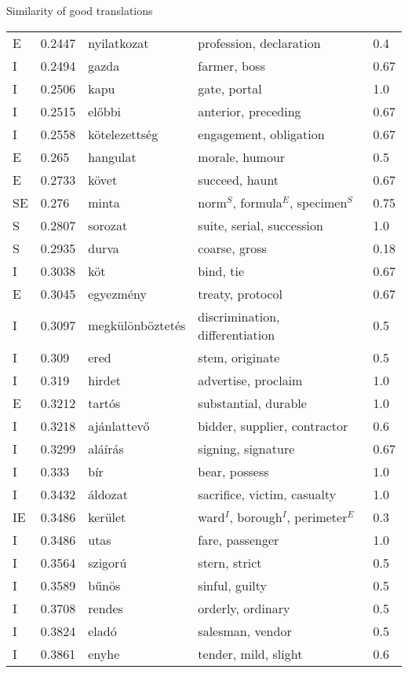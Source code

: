 \documentclass[10pt]{beamer}%
\newcommand{\e}{$^E$}
\newcommand{\id}{$^I$}
\newcommand{\s}{$^S$}
\begin{document}
\begin{frame} [allowframebreaks] {Similarity of good translations}
\begin{longtable}{lllll}
        E	& 0.2447	& nyilatkozat	& profession, declaration	& 0.4 \\
        I	& 0.2494	& gazda	& farmer, boss	& 0.67 \\
        I	& 0.2506	& kapu	& gate, portal	& 1.0 \\
        I	& 0.2515	& előbbi	& anterior, preceding	& 0.67 \\
        I	& 0.2558	& kötelezettség	& engagement, obligation	& 0.67 \\
        E	& 0.265	& hangulat	& morale, humour	& 0.5 \\
        E	& 0.2733	& követ	& succeed, haunt	& 0.67 \\
        SE	& 0.276	& minta	& norm\s, formula\e, specimen\s	& 0.75  \\
        S	& 0.2807	& sorozat	& suite, serial, succession	& 1.0 \\
        S	& 0.2935	& durva	& coarse, gross	& 0.18 \\
        I	& 0.3038	& köt	& bind, tie	& 0.67 \\
        E	& 0.3045	& egyezmény	& treaty, protocol	& 0.67 \\
        I	& 0.3097	& megkülönböztetés	& discrimination, differentiation	& 0.5 \\
        I	& 0.309	& ered	& stem, originate	& 0.5 \\
        I	& 0.319	& hirdet	& advertise, proclaim	& 1.0 \\
        E	& 0.3212	& tartós	& substantial, durable	& 1.0 \\
        I	& 0.3218	& ajánlattevő	& bidder, supplier, contractor	& 0.6 \\
        I	& 0.3299	& aláírás	& signing, signature	& 0.67 \\
        I	& 0.333	& bír	& bear, possess	& 1.0 \\
        I	& 0.3432	& áldozat	& sacrifice, victim, casualty	& 1.0 \\
        IE	& 0.3486	& kerület	& ward\id, borough\id, perimeter\e	& 0.3  \\
        I	& 0.3486	& utas	& fare, passenger	& 1.0 \\
        I	& 0.3564	& szigorú	& stern, strict	& 0.5 \\
        I	& 0.3589	& bűnös	& sinful, guilty	& 0.5 \\
        I	& 0.3708	& rendes	& orderly, ordinary	& 0.5 \\
        I	& 0.3824	& eladó	& salesman, vendor	& 0.5 \\
        I	& 0.3861	& enyhe	& tender, mild, slight	& 0.6 \\

\end{longtable}
\end{frame}
\end{document}
